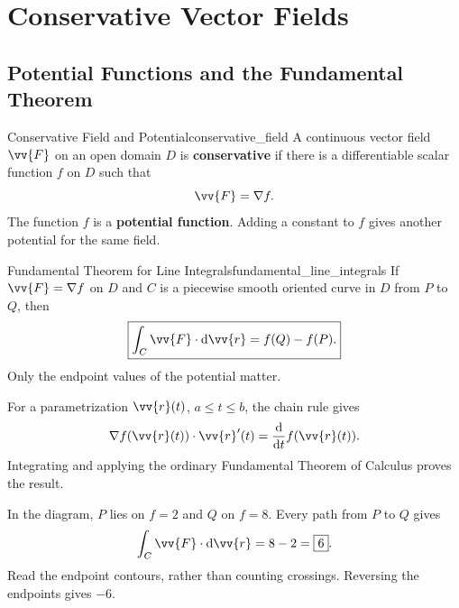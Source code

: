 \section{Conservative Vector Fields}
\subsection{Potential Functions and the Fundamental Theorem}

\begin{definition}{Conservative Field and Potential}{conservative_field}
A continuous vector field $\vv{F}$ on an open domain $D$ is \textbf{conservative} if there is a differentiable scalar function $f$ on $D$ such that
\[
    \vv{F} = \nabla f.
\]
The function $f$ is a \textbf{potential function}. Adding a constant to $f$ gives another potential for the same field.
\end{definition}

\begin{theorem}{Fundamental Theorem for Line Integrals}{fundamental_line_integrals}
If $\vv{F} = \nabla f$ on $D$ and $C$ is a piecewise smooth oriented curve in $D$ from $P$ to $Q$, then
\[
    \boxed{\int_C\vv{F}\cdot\dd{\vv{r}} = f(Q) - f(P).}
\]
Only the endpoint values of the potential matter.
\end{theorem}
For a parametrization $\vv{r}(t)$, $a \le t \le b$, the chain rule gives
\[
    \nabla f(\vv{r}(t))\cdot\vv{r}'(t) = \frac{\dd{}}{\dd{t}}f(\vv{r}(t)).
\]
Integrating and applying the ordinary Fundamental Theorem of Calculus proves the result.

\begin{example}
\begin{minipage}[c]{0.55\linewidth}
\vspace{1em}
In the diagram, $P$ lies on $f = 2$ and $Q$ on $f = 8$. Every path from $P$ to $Q$ gives
\[
    \int_C\vv{F}\cdot\dd{\vv{r}} = 8 - 2 = \boxed{6}.
\]
Read the endpoint contours, rather than counting crossings. Reversing the endpoints gives $-6$.
\end{minipage}\hfill
\begin{minipage}[c]{0.41\linewidth}
\centering
{}
\end{minipage}
\end{example}

